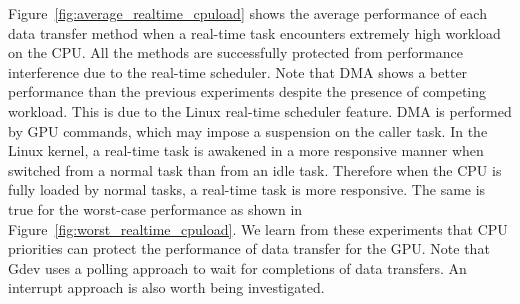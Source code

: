 Figure~\ref{fig:average_realtime_cpuload} shows the average performance
of each data transfer method when a real-time task encounters extremely
high workload on the CPU.
All the methods are successfully protected from performance interference
due to the real-time scheduler.
Note that \textsf{DMA} shows a better performance than the previous
experiments despite the presence of competing workload.
This is due to the Linux real-time scheduler feature.
\textsf{DMA} is performed by GPU commands, which may impose a
suspension on the caller task.
In the Linux kernel, a real-time task is awakened in a more responsive
manner when switched from a normal task than from an idle task.
Therefore when the CPU is fully loaded by normal tasks, a real-time task
is more responsive.
The same is true for the worst-case performance as shown in
Figure~\ref{fig:worst_realtime_cpuload}.
We learn from these experiments that CPU priorities can protect the
performance of data transfer for the GPU.
Note that Gdev uses a polling approach to wait for completions of data
transfers.
An interrupt approach is also worth being investigated.

